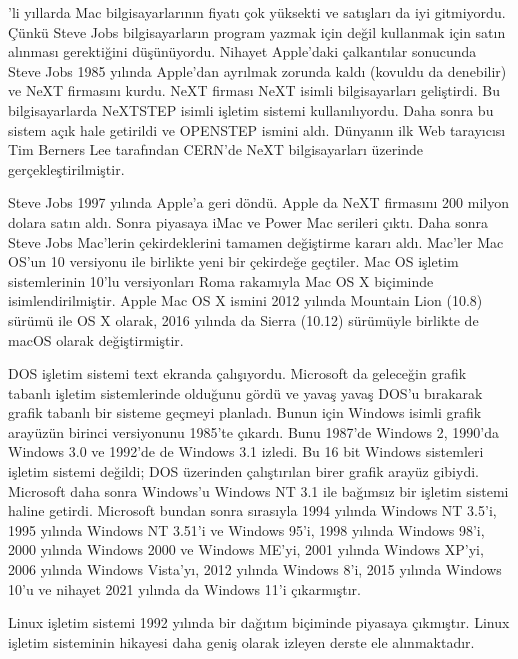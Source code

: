 \documentclass[a4paper,10pt,turkish]{sphinxmanual}
\begin{document}
’li yıllarda Mac bilgisayarlarının fiyatı çok yüksekti ve satışları da iyi gitmiyordu.
Çünkü Steve Jobs bilgisayarların program yazmak için değil kullanmak için satın alınması
gerektiğini düşünüyordu. Nihayet Apple’daki çalkantılar sonucunda Steve Jobs 1985 yılında
Apple’dan ayrılmak zorunda kaldı (kovuldu da denebilir) ve NeXT firmasını kurdu. NeXT
firması NeXT isimli bilgisayarları geliştirdi. Bu bilgisayarlarda NeXTSTEP isimli işletim
sistemi kullanılıyordu. Daha sonra bu sistem açık hale getirildi ve OPENSTEP ismini aldı.
Dünyanın ilk Web tarayıcısı Tim Berners Lee tarafından CERN’de NeXT bilgisayarları üzerinde
gerçekleştirilmiştir.

\sphinxAtStartPar
Steve Jobs 1997 yılında Apple’a geri döndü. Apple da NeXT firmasını 200 milyon dolara satın
aldı. Sonra piyasaya iMac ve Power Mac serileri çıktı. Daha sonra Steve Jobs Mac’lerin
çekirdeklerini tamamen değiştirme kararı aldı. Mac’ler Mac OS’un 10 versiyonu ile birlikte
yeni bir çekirdeğe geçtiler. Mac OS işletim sistemlerinin 10’lu versiyonları Roma rakamıyla
Mac OS X biçiminde isimlendirilmiştir. Apple Mac OS X ismini 2012 yılında Mountain Lion
(10.8) sürümü ile OS X olarak, 2016 yılında da Sierra (10.12) sürümüyle birlikte de macOS
olarak değiştirmiştir.

\sphinxAtStartPar
DOS işletim sistemi text ekranda çalışıyordu. Microsoft da geleceğin grafik tabanlı işletim
sistemlerinde olduğunu gördü ve yavaş yavaş DOS’u bırakarak grafik tabanlı bir sisteme
geçmeyi planladı. Bunun için Windows isimli grafik arayüzün birinci versiyonunu 1985’te
çıkardı. Bunu 1987’de Windows 2, 1990’da Windows 3.0 ve 1992’de de Windows 3.1 izledi.
Bu 16 bit Windows sistemleri işletim sistemi değildi; DOS üzerinden çalıştırılan birer
grafik arayüz gibiydi. Microsoft daha sonra Windows’u Windows NT 3.1 ile bağımsız bir
işletim sistemi haline getirdi. Microsoft bundan sonra sırasıyla 1994 yılında Windows NT
3.5’i, 1995 yılında Windows NT 3.51’i ve Windows 95’i, 1998 yılında Windows 98’i, 2000
yılında Windows 2000 ve Windows ME’yi, 2001 yılında Windows XP’yi, 2006 yılında Windows
Vista’yı, 2012 yılında Windows 8’i, 2015 yılında Windows 10’u ve nihayet 2021 yılında da
Windows 11’i çıkarmıştır.

\sphinxAtStartPar
Linux işletim sistemi 1992 yılında bir dağıtım biçiminde piyasaya çıkmıştır. Linux işletim
sisteminin hikayesi daha geniş olarak izleyen derste ele alınmaktadır.
\end{document}
